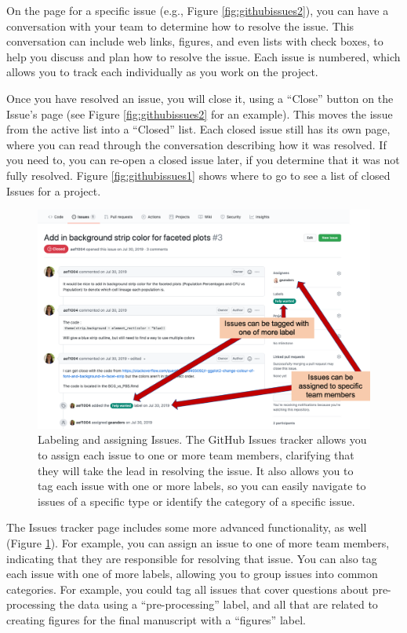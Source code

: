 \documentclass[]{tufte-book}
\begin{document}
On the page for a specific issue (e.g., Figure \ref{fig:githubissues2}), you
can have a conversation with your team to determine how to resolve the issue.
This conversation can include web links, figures, and even lists with check boxes, to
help you discuss and plan how to resolve the issue. Each issue is numbered,
which allows you to track each individually as you work on the project.

Once you have resolved an issue, you will close it, using a ``Close'' button on the
Issue's page (see Figure \ref{fig:githubissues2} for an example). This moves the issue
from the active list into a ``Closed'' list. Each closed issue still has its
own page, where you can read through the conversation describing how it
was resolved. If you need to, you can re-open a closed issue later, if you
determine that it was not fully resolved. Figure \ref{fig:githubissues1} shows
where to go to see a list of closed Issues for a project.

\begin{figure}
\includegraphics[width=\textwidth]{figures/github_issues3} \caption[Labeling and assigning Issues]{Labeling and assigning Issues. The GitHub Issues tracker allows you to assign each issue to one or more team members, clarifying that they will take the lead in resolving the issue. It also allows you to tag each issue with one or more labels, so you can easily navigate to issues of a specific type or identify the category of a specific issue.}\label{fig:githubissues3}
\end{figure}

The Issues tracker page includes some more advanced functionality, as well
(Figure \ref{fig:githubissues3}). For example, you can assign an issue to one
of more team members, indicating that they are responsible for resolving that
issue. You can also tag each issue with one of more labels, allowing you to
group issues into common categories. For example, you could tag all issues that
cover questions about pre-processing the data using a ``pre-processing'' label,
and all that are related to creating figures for the final manuscript with a
``figures'' label.
\end{document}
